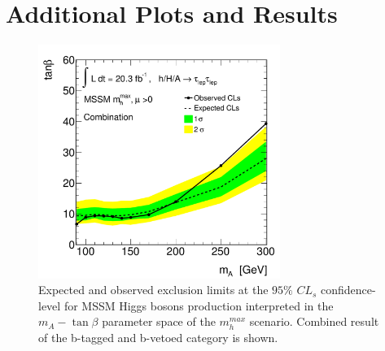 
\chapter{Additional Plots and Results}\label{appendix:result}

\begin{figure}[!h]
  \centering
  \includegraphics[width=0.7\textwidth]{figure/limits/comb_reg_spin.pdf}
  \caption{Expected and observed  exclusion limits at the $95\%$ $CL_s$ confidence-level for MSSM Higgs bosons production 
   interpreted in the  $m_A - \tan\beta$ parameter space of the $m_h^{max}$ scenario. 
	Combined result of the  b-tagged and b-vetoed category is shown.}
\end{figure}

